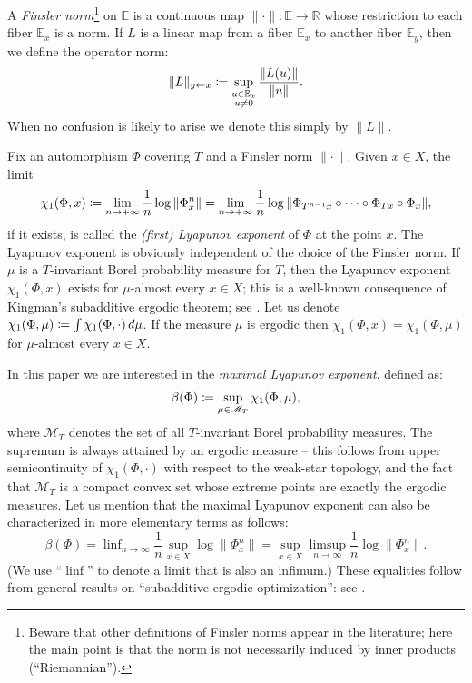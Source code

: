 \documentclass[10pt]{amsart}
\let\mathcal\mathscr
\def\vcentcolon{\mathrel{\mathop\ordinarycolon}}
\providecommand\ordinarycolon{:}
\providecommand*\coloneqq{\vcentcolon\mathrel{\mkern-1.2mu}=}
\theoremstyle{plain}
\theoremstyle{definition}
\newcommand{\RR}{\mathbb{R}}
\newcommand{\EE}{\mathbb{E}}
\newcommand{\cM}{\mathcal{M}}
\DeclareMathOperator*{\linf}{linf}
\begin{document}
A \emph{Finsler norm}\footnote{Beware that other definitions of Finsler norms appear in the literature; here the main point is that the norm is not necessarily induced by inner products (\ie ``Riemannian'').}
on $\EE$ is a continuous map $\| \mathord{\cdot} \| \colon \EE \to \RR$ whose restriction to each fiber $\EE_x$ is a norm.
If $L$ is a linear map from a fiber $\EE_x$ to another fiber $\EE_y$, then we define the operator norm:
\begin{equation}\label{e.def_operator_norm}
\|L\|_{y \gets x} \coloneqq \sup_{\substack{u \in \EE_x \\ u\neq 0}} \frac{\|L(u)\|}{\|u\|}.
\end{equation}
When no confusion is likely to arise we denote this simply by $\|L\|$.

Fix an automorphism $\Phi$ covering $T$ and a Finsler norm $\| \mathord{\cdot} \|$.
Given $x \in X$, the limit
\[
\chi_1(\Phi, x) \coloneqq \lim_{n \to +\infty} \frac{1}{n} \log \|\Phi^n_x\|
= \lim_{n \to +\infty} \frac{1}{n} \log \| \Phi_{T^{n-1}x} \circ \cdots \circ \Phi_{Tx} \circ \Phi_x\|,
\]
if it exists, is called the \emph{(first) Lyapunov exponent} of $\Phi$ at the point $x$.
The Lyapunov exponent is obviously independent of the choice of the Finsler norm.
If $\mu$ is a $T$\nobreakdash-invariant Borel probability measure for $T$, then the Lyapunov exponent $\chi_1(\Phi, x)$
exists for $\mu$-almost every $x\in X$; this is a well-known consequence of Kingman's subadditive ergodic theorem; see \eg \cite{Krengel}.
Let us denote $\chi_1(\Phi, \mu) \coloneqq \int \chi_1(\Phi,\mathord{\cdot}) \, d\mu$.
If the measure $\mu$ is ergodic then $\chi_1(\Phi, x) = \chi_1(\Phi,\mu)$ for $\mu$-almost every $x\in X$.

In this paper we are interested in the \emph{maximal Lyapunov exponent}, defined as:
\begin{equation}\label{e.def_beta}
\beta(\Phi) \coloneqq \sup_{\mu \in \cM_T} \chi_1(\Phi, \mu),
\end{equation}
where $\cM_T$ denotes the set of all $T$-invariant Borel probability measures.
The supremum is always attained by an ergodic measure -- this follows from upper semicontinuity of $\chi_1(\Phi, \mathord{\cdot})$ with respect to the weak-star topology, and the fact that $\cM_T$ is a compact convex set whose extreme points are exactly the ergodic measures.
Let us mention that the maximal Lyapunov exponent can also be characterized in more elementary terms as follows:
\begin{equation}\label{e.beta_other}
\beta(\Phi) = \linf_{n \to \infty} \frac{1}{n} \sup_{x \in X} \log \| \Phi^n_x \|
= \sup_{x \in X} \limsup_{n \to \infty} \frac{1}{n} \log \| \Phi^n_x \|.
\end{equation}
(We use ``$\linf$'' to denote a limit that is also an infimum.)
These equalities follow from general results on ``subadditive ergodic optimization'': see \cite[App.\,A]{Morris_Mather}.
\end{document}
